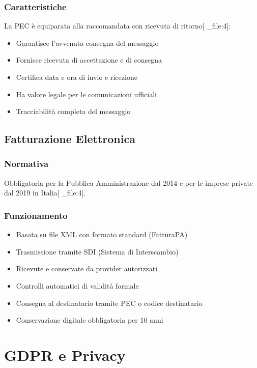 \documentclass[12pt,a4paper]{article}
\begin{document}
\subsubsection{Caratteristiche}
La PEC è equiparata alla raccomandata con ricevuta di ritorno[ _file:4]:
\begin{itemize}
    \item Garantisce l'avvenuta consegna del messaggio
    \item Fornisce ricevuta di accettazione e di consegna
    \item Certifica data e ora di invio e ricezione
    \item Ha valore legale per le comunicazioni ufficiali
    \item Tracciabilità completa del messaggio
\end{itemize}

\subsection{Fatturazione Elettronica}

\subsubsection{Normativa}
Obbligatoria per la Pubblica Amministrazione dal 2014 e per le imprese private dal 2019 in Italia[ _file:4].

\subsubsection{Funzionamento}
\begin{itemize}
    \item Basata su file XML con formato standard (FatturaPA)
    \item Trasmissione tramite SDI (Sistema di Interscambio)
    \item Ricevute e conservate da provider autorizzati
    \item Controlli automatici di validità formale
    \item Consegna al destinatario tramite PEC o codice destinatario
    \item Conservazione digitale obbligatoria per 10 anni
\end{itemize}

\section{GDPR e Privacy}
\end{document}
